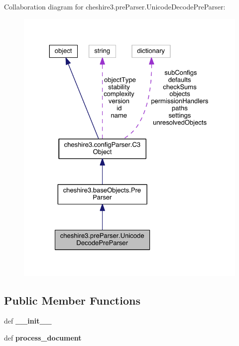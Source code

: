 Collaboration diagram for cheshire3.\-pre\-Parser.\-Unicode\-Decode\-Pre\-Parser\-:
\nopagebreak
\begin{figure}[H]
\begin{center}
\leavevmode
\includegraphics[width=325pt]{classcheshire3_1_1pre_parser_1_1_unicode_decode_pre_parser__coll__graph}
\end{center}
\end{figure}
\subsection*{Public Member Functions}
\begin{DoxyCompactItemize}
\item 
\hypertarget{classcheshire3_1_1pre_parser_1_1_unicode_decode_pre_parser_a8389aa97a1fad9e0ccc2c328b70b5d07}{def {\bfseries \-\_\-\-\_\-init\-\_\-\-\_\-}}\label{classcheshire3_1_1pre_parser_1_1_unicode_decode_pre_parser_a8389aa97a1fad9e0ccc2c328b70b5d07}

\item 
\hypertarget{classcheshire3_1_1pre_parser_1_1_unicode_decode_pre_parser_a94f007f4a666f4fcf131f9ec3eca6981}{def {\bfseries process\-\_\-document}}\label{classcheshire3_1_1pre_parser_1_1_unicode_decode_pre_parser_a94f007f4a666f4fcf131f9ec3eca6981}

\end{DoxyCompactItemize}
